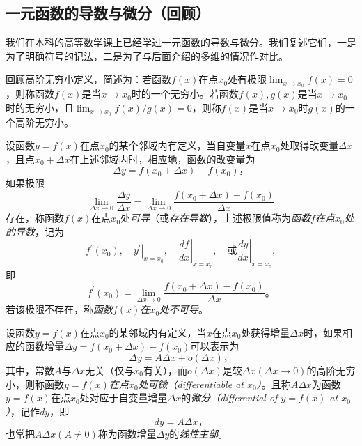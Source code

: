 \documentclass[main.tex]{subfiles}
\begin{document}
\subsection{一元函数的导数与微分（回顾）}
我们在本科的高等数学课上已经学过一元函数的导数与微分。我们复述它们，一是为了明确符号的记法，二是为了与后面介绍的多维的情况作对比。

回顾高阶无穷小定义，简述为：若函数$f\left(x\right)$在点$x_0$处有极限$\lim_{x\to x_0}f\left(x\right)=0$，则称函数$f\left(x\right)$是当$x\to x_0$时的一个无穷小。若函数$f\left(x\right),g\left(x\right)$是当$x\to x_0$时的无穷小，且$\lim_{x\to x_0}f\left(x\right)/g\left(x\right)=0$，则称$f\left(x\right)$是当$x\to x_0$时$g\left(x\right)$的一个高阶无穷小。

\begin{definition}[一元函数的导数]\label{def:II.4.7}\cite[定义2.1.1]{华工高数2009上}
    设函数$y=f\left(x\right)$在点$x_0$的某个邻域内有定义，当自变量$x$在点$x_0$处取得改变量$\Delta x$，且点$x_0+\Delta x$在上述邻域内时，相应地，函数的改变量为
    \[
        \Delta y=f\left(x_0+\Delta x\right)-f\left(x_0\right)\text{，}
    \]
    如果极限
    \[
        \lim_{\Delta x\to 0}\frac{\Delta y}{\Delta x}=\lim_{\Delta x\to 0}\frac{f\left(x_0+\Delta x\right)-f\left(x_0\right)}{\Delta x}
    \]
    存在，称函数$f\left(x\right)$在点$x_0$处\emph{可导}（或\emph{存在导数}），上述极限值称为\emph{函数$f$在点$x_0$处的导数}，记为
    \[f^\prime\left(x_0\right),\quad\left.y^\prime\right|_{x=x_0},\quad\left.\frac{df}{dx}\right|_{x=x_0},\quad\text{或}\left.\frac{dy}{dx}\right|_{x=x_0},
    \]
    即
    \[
        f^\prime\left(x_0\right)=\lim_{\Delta x\to 0}\frac{f\left(x_0+\Delta x\right)-f\left(x_0\right)}{\Delta x}\text{。}
    \]
    若该极限不存在，称\emph{函数$f\left(x\right)$在$x_0$处不可导}。
\end{definition}

\begin{definition}[一元函数的微分]\label{def:II.4.8}\cite[定义2.5.1]{华工高数2009上}
    设函数$y=f\left(x\right)$在点$x_0$的某邻域内有定义，当$x$在点$x_0$处获得增量$\Delta x$时，如果相应的函数增量$\Delta y=f\left(x_0+\Delta x\right)-f\left(x_0\right)$可以表示为
    \[\Delta y=A\Delta x+o\left(\Delta x\right)\text{，}
    \]
    其中，常数$A$与$\Delta x$无关（仅与$x_0$有关），而$o\left(\Delta x\right)$是较$\Delta x\left(\Delta x\to 0\right)$的高阶无穷小，则称函数$y=f\left(x\right)$\emph{在点$x_0$处可微（differentiable at $x_0$）}。且称$A\Delta x$为函数$y=f\left(x\right)$在点$x_0$处对应于自变量增量$\Delta x$的\emph{微分（differential of $y=f\left(x\right)$ at $x_0$）}，记作$dy$，即
    \[
        dy=A\Delta x\text{，}
    \]
    也常把$A\Delta x\left(A\neq 0\right)$称为函数增量$\Delta y$的\emph{线性主部}。
\end{definition}
\end{document}

